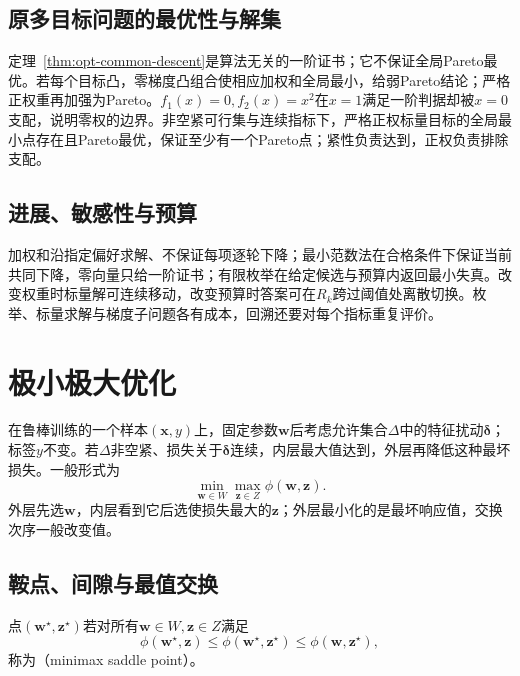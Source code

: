 \subsection{原多目标问题的最优性与解集}

定理~\ref{thm:opt-common-descent}是算法无关的一阶证书；它不保证全局Pareto最优。若每个目标凸，零梯度凸组合使相应加权和全局最小，给弱Pareto结论；严格正权重再加强为Pareto。$f_1(x)=0,f_2(x)=x^2$在$x=1$满足一阶判据却被$x=0$支配，说明零权的边界。非空紧可行集与连续指标下，严格正权标量目标的全局最小点存在且Pareto最优，保证至少有一个Pareto点；紧性负责达到，正权负责排除支配。

\subsection{进展、敏感性与预算}

加权和沿指定偏好求解、不保证每项逐轮下降；最小范数法在合格条件下保证当前共同下降，零向量只给一阶证书；有限枚举在给定候选与预算内返回最小失真。改变权重时标量解可连续移动，改变预算时答案可在$R_k$跨过阈值处离散切换。枚举、标量求解与梯度子问题各有成本，回溯还要对每个指标重复评价。

\section{极小极大优化}

在鲁棒训练的一个样本$(\bm x,y)$上，固定参数$\bm w$后考虑允许集合$\Delta$中的特征扰动$\bm\delta$；标签$y$不变。若$\Delta$非空紧、损失关于$\bm\delta$连续，内层最大值达到，外层再降低这种最坏损失。一般形式为
\begin{equation}
 \min_{\bm w\in W}\max_{\bm z\in Z}\phi(\bm w,\bm z).
 \label{eq:opt-minimax}
\end{equation}
外层先选$\bm w$，内层看到它后选使损失最大的$\bm z$；外层最小化的是最坏响应值，交换次序一般改变值。

\subsection{鞍点、间隙与最值交换}

\begin{definition}[极小极大鞍点]
\label{def:opt-minimax-saddle}
点$(\bm w^\star,\bm z^\star)$若对所有$\bm w\in W,\bm z\in Z$满足
\[
 \phi(\bm w^\star,\bm z)\leq\phi(\bm w^\star,\bm z^\star)
 \leq\phi(\bm w,\bm z^\star),
\]
称为（minimax saddle point）。
\end{definition}

